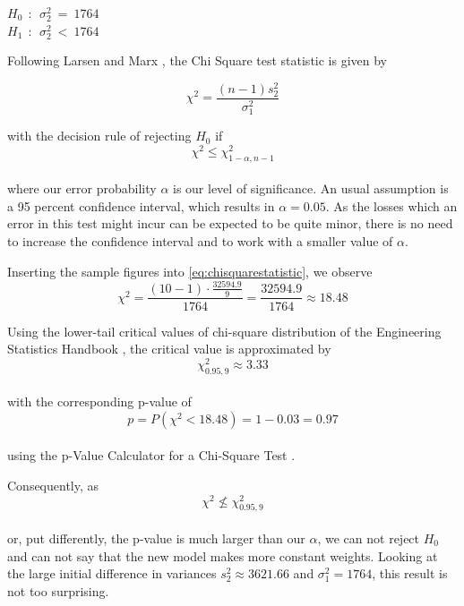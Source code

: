 \begin{center}
$H_0~~:~~ \sigma^2_2~=~1764$\\ 
$H_1~~:~~ \sigma^2_2~<~1764$
\end{center}

Following Larsen and Marx \cite[Chapter 7.5]{larsen2005introduction}, the Chi Square test statistic is given by 

\begin{equation}
\chi^2 = \frac{(n-1)s_2^2}{\sigma_1^2}
\label{eq:chisquarestatistic}
\end{equation}

with the decision rule of rejecting $H_0$ if 
\\
\begin{equation}
\chi^2 \leq \chi^2_{1-\alpha,n-1}
\label{eq:decisionrule}
\end{equation}
\\
where our error probability $\alpha$ is our level of significance. An usual assumption is a 95 percent confidence interval, which results in $\alpha = 0.05$. As the losses which an error in this test might incur can be expected to be quite minor, there is no need to increase the confidence interval and to work with a smaller value of $\alpha$.


Inserting the sample figures into \eqref{eq:chisquarestatistic}, we observe 
\begin{equation}
\chi^2 = \frac{(10-1) \cdot \frac{32594.9}{9}}{1764} = \frac{32594.9}{1764} \approx 18.48
\label{eq:chisqstatcalc}
\end{equation}

Using the lower-tail critical values of chi-square distribution of the Engineering Statistics Handbook \cite{nist}, the critical value is approximated by 
\\
\begin{equation}
\chi^2_{0.95,9}\approx 3.33
\label{eq:criticalvalue}
\end{equation}
\\
with the corresponding p-value of
\\
\begin{equation}
p = P(\chi^2 < 18.48) = 1-0.03 = 0.97
\label{eq:pvalue}
\end{equation}
\\
using the p-Value Calculator for a Chi-Square Test \cite{freepvalue}. 

Consequently, as 
\\
\begin{equation}
\chi^2 \nleq \chi^2_{0.95,9}
\label{eq:criticalvalue}
\end{equation}
\\
or, put differently, the p-value is much larger than our $\alpha$, we can not reject $H_0$ and can not say that the new model makes more constant weights. Looking at the large initial difference in variances $s_2^2 \approx 3621.66 $ and $\sigma^2_1 = 1764$, this result is not too surprising. 




